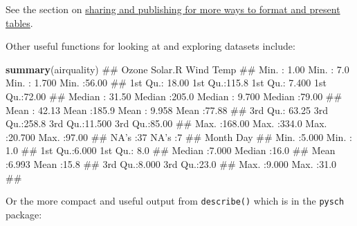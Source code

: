 \documentclass[]{article}
\newenvironment{Shaded}{\begin{snugshade}}{\end{snugshade}}
\newcommand{\KeywordTok}[1]{\textcolor[rgb]{0.13,0.29,0.53}{\textbf{#1}}}
\newcommand{\DataTypeTok}[1]{\textcolor[rgb]{0.13,0.29,0.53}{#1}}
\newcommand{\StringTok}[1]{\textcolor[rgb]{0.31,0.60,0.02}{#1}}
\newcommand{\CommentTok}[1]{\textcolor[rgb]{0.56,0.35,0.01}{\textit{#1}}}
\newcommand{\OperatorTok}[1]{\textcolor[rgb]{0.81,0.36,0.00}{\textbf{#1}}}
\newcommand{\NormalTok}[1]{#1}
\theoremstyle{definition}
\theoremstyle{definition}
\theoremstyle{definition}
\theoremstyle{remark}
\begin{document}
See the section on \protect\hyperlink{sharing-and-publication}{sharing
and publishing for more ways to format and present tables}.

Other useful functions for looking at and exploring datasets include:

\begin{Shaded}
\begin{Highlighting}[]
\KeywordTok{summary}\NormalTok{(airquality)}
\NormalTok{##      Ozone           Solar.R           Wind             Temp      }
\NormalTok{##  Min.   :  1.00   Min.   :  7.0   Min.   : 1.700   Min.   :56.00  }
\NormalTok{##  1st Qu.: 18.00   1st Qu.:115.8   1st Qu.: 7.400   1st Qu.:72.00  }
\NormalTok{##  Median : 31.50   Median :205.0   Median : 9.700   Median :79.00  }
\NormalTok{##  Mean   : 42.13   Mean   :185.9   Mean   : 9.958   Mean   :77.88  }
\NormalTok{##  3rd Qu.: 63.25   3rd Qu.:258.8   3rd Qu.:11.500   3rd Qu.:85.00  }
\NormalTok{##  Max.   :168.00   Max.   :334.0   Max.   :20.700   Max.   :97.00  }
\NormalTok{##  NA's   :37       NA's   :7                                       }
\NormalTok{##      Month            Day      }
\NormalTok{##  Min.   :5.000   Min.   : 1.0  }
\NormalTok{##  1st Qu.:6.000   1st Qu.: 8.0  }
\NormalTok{##  Median :7.000   Median :16.0  }
\NormalTok{##  Mean   :6.993   Mean   :15.8  }
\NormalTok{##  3rd Qu.:8.000   3rd Qu.:23.0  }
\NormalTok{##  Max.   :9.000   Max.   :31.0  }
\NormalTok{## }
\end{Highlighting}
\end{Shaded}

Or the more compact and useful output from \texttt{describe()} which is
in the \texttt{pysch} package:

\begin{Shaded}
\end{Shaded}
\end{document}
